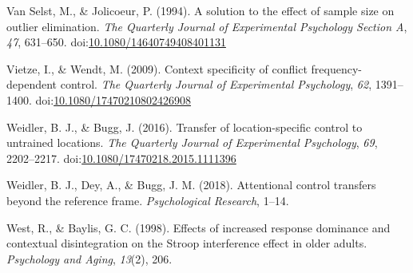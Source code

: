 \documentclass[english,,man,floatsintext]{apa6}
\begin{document}
\leavevmode\hypertarget{ref-van_selst_solution_1994}{}%
Van Selst, M., \& Jolicoeur, P. (1994). A solution to the effect of sample size on outlier elimination. \emph{The Quarterly Journal of Experimental Psychology Section A}, \emph{47}, 631--650. doi:\href{https://doi.org/10.1080/14640749408401131}{10.1080/14640749408401131}

\leavevmode\hypertarget{ref-vietze_context_2009}{}%
Vietze, I., \& Wendt, M. (2009). Context specificity of conflict frequency-dependent control. \emph{The Quarterly Journal of Experimental Psychology}, \emph{62}, 1391--1400. doi:\href{https://doi.org/10.1080/17470210802426908}{10.1080/17470210802426908}

\leavevmode\hypertarget{ref-weidler_transfer_2016}{}%
Weidler, B. J., \& Bugg, J. (2016). Transfer of location-specific control to untrained locations. \emph{The Quarterly Journal of Experimental Psychology}, \emph{69}, 2202--2217. doi:\href{https://doi.org/10.1080/17470218.2015.1111396}{10.1080/17470218.2015.1111396}

\leavevmode\hypertarget{ref-weidler_attentional_2018}{}%
Weidler, B. J., Dey, A., \& Bugg, J. M. (2018). Attentional control transfers beyond the reference frame. \emph{Psychological Research}, 1--14.

\leavevmode\hypertarget{ref-west_effects_1998}{}%
West, R., \& Baylis, G. C. (1998). Effects of increased response dominance and contextual disintegration on the Stroop interference effect in older adults. \emph{Psychology and Aging}, \emph{13}(2), 206.

\endgroup

\newpage
\end{document}
